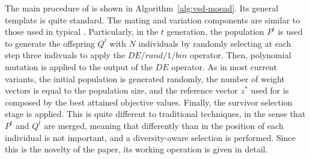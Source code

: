 The main procedure of \AVSDMOEAD{} is shown in Algorithm~\ref{alg:vsd-moead}.
%
Its general template is quite standard.
%
The mating and variation components are similar to those used in typical \MOEAS{}.
%
Particularly, in the $t$ generation, the population $P^t$ is used to generate
the offspring $Q^t$ with $N$ individuals by randomly selecting at each step three indivuals
to apply the $DE/rand/1/bin$ operator.
%
Then, polynomial mutation is applied to the output of the $DE$ operator.
%
As in most current \MOEAD{} variants, the initial population is generated randomly,
the number of weight vectors is equal to the population size,
and the reference vector $z^*$ used for \ASF{} is composed by the best attained 
objective values.
%
Finally, the survivor selection stage is applied.
%
This is quite different to traditional techniques, in the sense that $P^t$ and $Q^t$ are merged, meaning
that differently than in \MOEAD{} the position of each individual is not important, and a diversity-aware
selection is performed.
%
Since this is the novelty of the paper, its working operation is given in detail.

